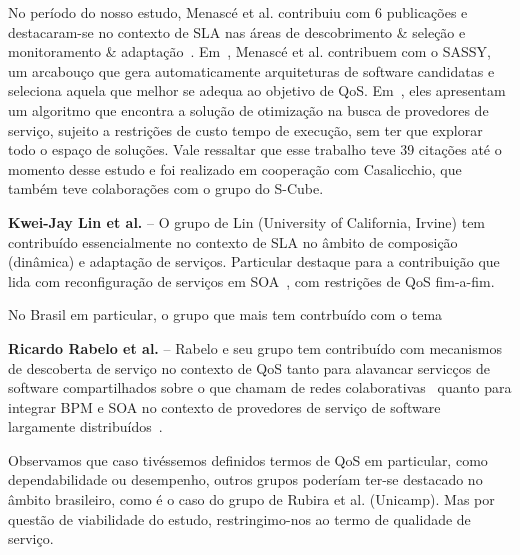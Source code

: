 No per\'{i}odo do nosso estudo, Menasc\'{e} et al. contribuiu com 6 publica\c{c}\~{o}es e destacaram-se no contexto de SLA nas \'{a}reas de descobrimento \& sele\c{c}\~{a}o e monitoramento \& adapta\c{c}\~{a}o~\cite{5696721}\cite{DBLP:MenasceCD10}\cite{5552741}. Em~\cite{5696721}, Menasc\'{e} et al. contribuem com o SASSY, um arcabou\c{c}o que gera automaticamente arquiteturas de software candidatas e seleciona aquela que melhor se adequa ao objetivo de QoS. Em~\cite{DBLP:MenasceCD10}, eles apresentam um algoritmo que encontra a solu\c{c}\~{a}o de otimiza\c{c}\~{a}o na busca de provedores de servi\c{c}o, sujeito a restri\c{c}\~{o}es de custo tempo de execu\c{c}\~{a}o, sem ter que explorar todo o espa\c{c}o de solu\c{c}\~{o}es. Vale ressaltar que esse trabalho teve 39 cita\c{c}\~{o}es at\'{e} o momento desse estudo e foi realizado em coopera\c{c}\~{a}o com Casalicchio, que tamb\'{e}m teve colabora\c{c}\~{o}es com o grupo do S-Cube.  

\textbf{Kwei-Jay Lin et al.} -- O grupo de Lin (University of California, Irvine) tem contribu\'{i}do essencialmente no contexto de SLA no \^{a}mbito de composi\c{c}\~{a}o (din\^{a}mica) e adapta\c{c}\~{a}o de servi\c{c}os. Particular destaque para  a contribui\c{c}\~{a}o \cite{Lin:2009:EAS:1602932.1603224, Lin:2010:DIS:1861294.1861332, Zhai:2009:SMS:1586636.1586972} que lida com reconfigura\c{c}\~{a}o de servi\c{c}os em SOA~\cite{SOA REFERENCE}, com restri\c{c}\~{o}es de QoS fim-a-fim. 

No Brasil em particular, o grupo que mais tem contrbu\'{i}do com o tema 

\textbf{Ricardo Rabelo et al.} --  Rabelo e seu grupo tem contribu\'{i}do com mecanismos de descoberta de servi\c{c}o no contexto de QoS tanto para alavancar servic\c{c}os de software compartilhados sobre o que chamam de redes colaborativas~\cite{conf/ifip5-5/Perin-SouzaR11} quanto para integrar BPM e SOA no contexto de provedores de servi\c{c}o de software largamente distribu\'{i}dos~\cite{Perin-Souza:2010:AMA:1909623.1909668}.

Observamos que caso tiv\'{e}ssemos definidos termos de QoS em particular, como dependabilidade ou desempenho, outros grupos poder\'{i}am ter-se destacado no \^{a}mbito brasileiro, como \'{e} o caso do grupo de Rubira et al. (Unicamp). Mas por quest\~{a}o de viabilidade do estudo, restringimo-nos ao termo de qualidade de servi\c{c}o.